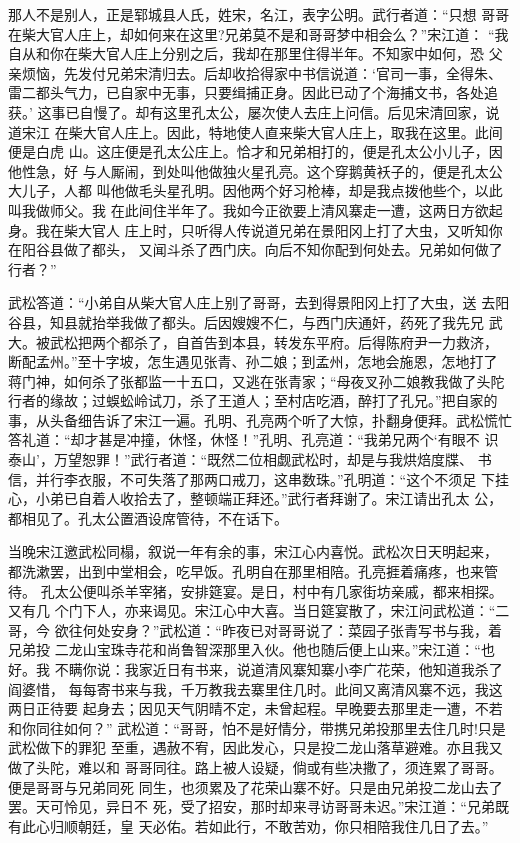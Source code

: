 那人不是别人，正是郓城县人氏，姓宋，名江，表字公明。武行者道：“只想
哥哥在柴大官人庄上，却如何来在这里?兄弟莫不是和哥哥梦中相会么？”宋江道：
“我自从和你在柴大官人庄上分别之后，我却在那里住得半年。不知家中如何，恐
父亲烦恼，先发付兄弟宋清归去。后却收拾得家中书信说道：‘官司一事，全得朱、
雷二都头气力，已自家中无事，只要缉捕正身。因此已动了个海捕文书，各处追获。’
这事已自慢了。却有这里孔太公，屡次使人去庄上问信。后见宋清回家，说道宋江
在柴大官人庄上。因此，特地使人直来柴大官人庄上，取我在这里。此间便是白虎
山。这庄便是孔太公庄上。恰才和兄弟相打的，便是孔太公小儿子，因他性急，好
与人厮闹，到处叫他做独火星孔亮。这个穿鹅黄袄子的，便是孔太公大儿子，人都
叫他做毛头星孔明。因他两个好习枪棒，却是我点拨他些个，以此叫我做师父。我
在此间住半年了。我如今正欲要上清风寨走一遭，这两日方欲起身。我在柴大官人
庄上时，只听得人传说道兄弟在景阳冈上打了大虫，又听知你在阳谷县做了都头，
又闻斗杀了西门庆。向后不知你配到何处去。兄弟如何做了行者？”

武松答道：“小弟自从柴大官人庄上别了哥哥，去到得景阳冈上打了大虫，送
去阳谷县，知县就抬举我做了都头。后因嫂嫂不仁，与西门庆通奸，药死了我先兄
武大。被武松把两个都杀了，自首告到本县，转发东平府。后得陈府尹一力救济，
断配孟州。”至十字坡，怎生遇见张青、孙二娘；到孟州，怎地会施恩，怎地打了
蒋门神，如何杀了张都监一十五口，又逃在张青家；“母夜叉孙二娘教我做了头陀
行者的缘故；过蜈蚣岭试刀，杀了王道人；至村店吃酒，醉打了孔兄。”把自家的
事，从头备细告诉了宋江一遍。孔明、孔亮两个听了大惊，扑翻身便拜。武松慌忙
答礼道：“却才甚是冲撞，休怪，休怪！”孔明、孔亮道：“我弟兄两个‘有眼不
识泰山’，万望恕罪！”武行者道：“既然二位相觑武松时，却是与我烘焙度牒、
书信，并行李衣服，不可失落了那两口戒刀，这串数珠。”孔明道：“这个不须足
下挂心，小弟已自着人收拾去了，整顿端正拜还。”武行者拜谢了。宋江请出孔太
公，都相见了。孔太公置酒设席管待，不在话下。

当晚宋江邀武松同榻，叙说一年有余的事，宋江心内喜悦。武松次日天明起来，
都洗漱罢，出到中堂相会，吃早饭。孔明自在那里相陪。孔亮捱着痛疼，也来管待。
孔太公便叫杀羊宰猪，安排筵宴。是日，村中有几家街坊亲戚，都来相探。又有几
个门下人，亦来谒见。宋江心中大喜。当日筵宴散了，宋江问武松道：“二哥，今
欲往何处安身？”武松道：“昨夜已对哥哥说了：菜园子张青写书与我，着兄弟投
二龙山宝珠寺花和尚鲁智深那里入伙。他也随后便上山来。”宋江道：“也好。我
不瞒你说：我家近日有书来，说道清风寨知寨小李广花荣，他知道我杀了阎婆惜，
每每寄书来与我，千万教我去寨里住几时。此间又离清风寨不远，我这两日正待要
起身去；因见天气阴晴不定，未曾起程。早晚要去那里走一遭，不若和你同往如何？”
武松道：“哥哥，怕不是好情分，带携兄弟投那里去住几时!只是武松做下的罪犯
至重，遇赦不宥，因此发心，只是投二龙山落草避难。亦且我又做了头陀，难以和
哥哥同往。路上被人设疑，倘或有些决撒了，须连累了哥哥。便是哥哥与兄弟同死
同生，也须累及了花荣山寨不好。只是由兄弟投二龙山去了罢。天可怜见，异日不
死，受了招安，那时却来寻访哥哥未迟。”宋江道：“兄弟既有此心归顺朝廷，皇
天必佑。若如此行，不敢苦劝，你只相陪我住几日了去。”

